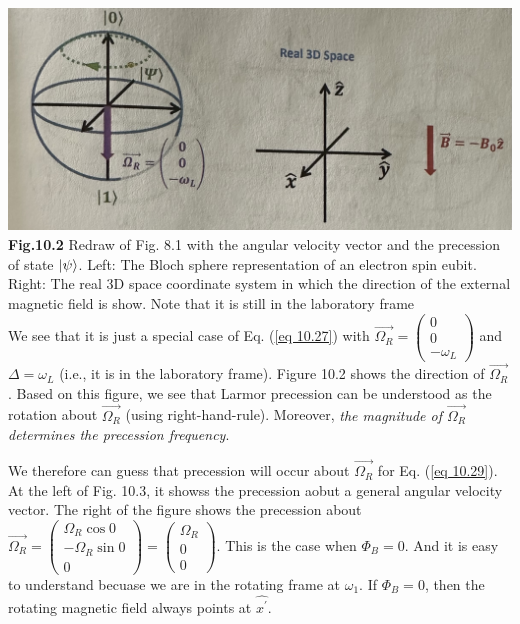 \documentclass{article}
\begin{document}
\includegraphics[scale=0.5]{Fig.10.2.jpeg}\\
\textbf{Fig.10.2} Redraw of Fig. 8.1 with the angular velocity vector and the precession of state
$\ket{\psi}$. Left: The Bloch sphere representation of an electron spin eubit. Right: The real 3D space coordinate
system in which the direction of the external magnetic field is show. Note that it is still in the laboratory frame\\

We see that it is just a special case of Eq. (\ref{eq 10.27}) with $\vec{\varOmega_R}=\begin{pmatrix}
    0\\0\\-\omega_L
\end{pmatrix}$ and $\varDelta=\omega_L$ (i.e., it is in the laboratory frame). Figure 10.2 shows
the direction of $\vec{\varOmega_R}$. Based on this figure, we see that Larmor precession can be understood as the rotation
about $\vec{\varOmega_R}$ (using right-hand-rule). Moreover, \textit{the magnitude of $\vec{\varOmega_R}$ determines the precession frequency}.

We therefore can guess that precession will occur about $\vec{\varOmega_R}$ for Eq. (\ref{eq 10.29}). At the left
of Fig. 10.3, it showss the precession aobut a general angular velocity vector.
The right of the figure shows the precession about $\vec{\varOmega_R}=\begin{pmatrix}
    \varOmega_R\cos0\\ -\varOmega_R\sin0\\0
\end{pmatrix}= \begin{pmatrix}
    \varOmega_R\\0\\0
\end{pmatrix}$. This is the case when $\varPhi_B=0$. And it is easy to understand becuase we are in the 
rotating frame at $\omega_1$. If $\varPhi_B=0$, then the rotating magnetic field always points at 
$\hat{x^\prime}$.
\end{document}
